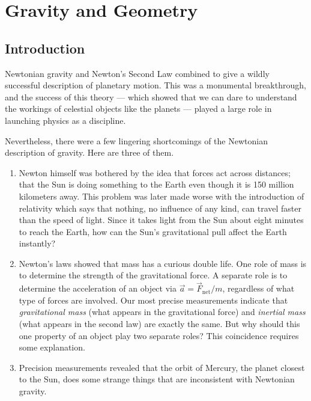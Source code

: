 \chapter{Gravity and Geometry}
\label{chap:gravity}

\section{Introduction}

Newtonian gravity and Newton's Second Law combined to give a wildly
successful description of planetary motion.  This was a
monumental breakthrough, and the success of this theory --- which showed
that we can dare to understand the workings of celestial objects like
the planets --- played a large role in launching physics as a
discipline.

Nevertheless, there were a few lingering shortcomings of the Newtonian
description of gravity.  Here are three of them.
\begin{enumerate}
\item Newton himself was bothered by the idea that forces act across
  distances; that the Sun is doing something to the Earth even though
  it is 150 million kilometers away.  This problem was later made
  worse with the introduction of relativity which says that nothing,
  no influence of any kind, can travel faster than the speed of light.
  Since it takes light from the Sun about eight minutes to reach the
  Earth, how can the Sun's gravitational pull affect the Earth
  instantly?

\item Newton's laws showed that mass has a curious double life.  One
  role of mass is to determine the strength of the gravitational
  force.  A separate role is to determine the acceleration of an
  object via $\vec a = \vec F_\text{net}/m$, regardless of what type
  of forces are involved.  Our most precise measurements indicate that
  \textit{gravitational mass} (what appears in the gravitational
  force) and \textit{inertial mass} (what appears in the second law)
  are exactly the same.  But why should this one property of an object
  play two separate roles?  This coincidence requires some
  explanation.

\item Precision measurements revealed that the orbit of Mercury, the
  planet closest to the Sun, does some strange things that are
  inconsistent with Newtonian gravity.

\end{enumerate}

